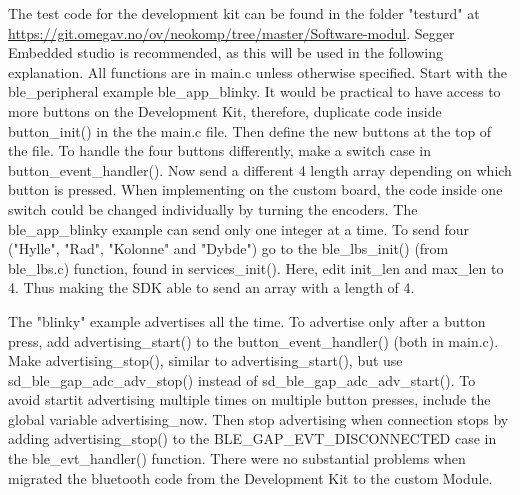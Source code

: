 The test code for the development kit can be found in the folder "testurd" at \url{https://git.omegav.no/ov/neokomp/tree/master/Software-modul}. Segger Embedded studio is recommended, as this will be used in the following explanation. All functions are in main.c unless otherwise specified.
Start with the ble\_peripheral example ble\_app\_blinky. It would be practical to have access to more buttons on the Development Kit, therefore, duplicate code inside button\_init() in the the main.c file. Then define the new buttons at the top of the file. To handle the four buttons differently, make a switch case in button\_event\_handler(). Now send a different 4 length array depending on which button is pressed. When implementing on the custom board, the code inside one switch could be changed individually by turning the encoders. The ble\_app\_blinky example can send only one integer at a time. To send four ("Hylle", "Rad", "Kolonne" and "Dybde") go to the ble\_lbs\_init() (from ble\_lbs.c) function, found in services\_init(). Here, edit init\_len and max\_len to 4. Thus making the SDK able to send an array with a length of 4.

The "blinky" example advertises all the time. To advertise only after a button press, add advertising\_start() to the button\_event\_handler() (both in main.c). Make advertising\_stop(), similar to advertising\_start(), but use sd\_ble\_gap\_adc\_adv\_stop() instead of sd\_ble\_gap\_adc\_adv\_start(). To avoid startit advertising multiple times on multiple button presses, include the global variable advertising\_now. Then stop advertising when connection stops by adding advertising\_stop() to the BLE\_GAP\_EVT\_DISCONNECTED case in the ble\_evt\_handler() function. There were no substantial problems when migrated the bluetooth code from the Development Kit to the custom Module.


